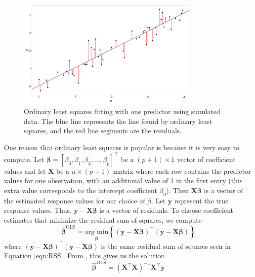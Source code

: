 \documentclass{article}
\newcommand{\argmin}[2]{\underset{#1}{\text{arg min}}\left\{#2\right\}}
\begin{document}
\begin{figure}[!h]
	\centering
	\includegraphics[width = 0.8\textwidth]{images/ols.png}
	\captionsetup{width = 0.8\textwidth}
	\caption{Ordinary least squares fitting with one predictor using simulated data. The blue line represents the line found by ordinary least squares, and the red line segments are the residuals.}
	\label{fig:ols}
\end{figure}

One reason that ordinary least squares is popular is because it is very easy to compute. Let $\bm{\beta} = [\beta_0, \beta_1, \beta_2, \dotsc, \beta_p]^\top$ be a $(p + 1) \times 1$ vector of coefficient values and let $\mathbf{X}$ be a $n\times (p + 1)$ matrix where each row contains the predictor values for one observation, with an additional value of 1 in the first entry (this extra value corresponds to the intercept coefficient $\beta_0$). Then $\mathbf{X}\bm{\beta}$ is a vector of the estimated response values for our choice of $\beta$. Let $\mathbf{y}$ represent the true response values. Thus, $\mathbf{y} - \mathbf{X}\bm{\beta}$ is a vector of residuals. To choose coefficient estimates that minimize the residual sum of squares, we compute
\begin{equation}
	\hat{\bm{\beta}}^{\text{OLS}} = \argmin{\bm{\beta}}{(\mathbf{y} - \mathbf{X}\bm{\beta})^\top (\mathbf{y} - \mathbf{X}\bm{\beta})}
\end{equation}
where $(\mathbf{y} - \mathbf{X}\bm{\beta})^\top (\mathbf{y} - \mathbf{X}\bm{\beta})$ is the same residual sum of squares seen in Equation \ref{eqn:RSS}. From \cite{friedman2001elements}, this gives us the solution
\begin{equation}\label{eqn:ols-solution}
	\hat{\bm{\beta}}^{\text{OLS}} = (\mathbf{X}^\top \mathbf{X})^{-1} \mathbf{X}^\top \mathbf{y}
\end{equation}
\end{document}
